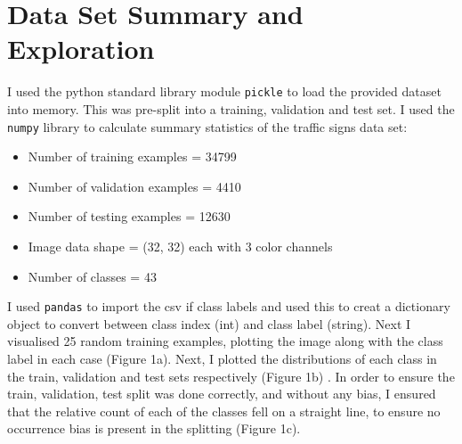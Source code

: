\documentclass[letterpaper,12pt]{article}
\begin{document}
\section{Data Set Summary and Exploration }
I used the python standard library module \texttt{pickle} to load the provided dataset into memory. This was pre-split into a training, validation and test set. I used the \texttt{numpy} library to calculate summary statistics of the traffic signs data set: 
\begin{itemize}
\item Number of training examples = 34799 
\item Number of validation examples = 4410 
\item Number of testing examples = 12630 
\item Image data shape = (32, 32) each with 3 color channels 
\item Number of classes = 43
\end{itemize}
I used \texttt{pandas} to import the csv if class labels and used this to creat a dictionary object to convert between class index (int) and class label (string). Next I visualised 25 random training examples, plotting the image along with the class label in each case (Figure 1a). Next, I plotted the distributions of each class in the train, validation and test sets respectively (Figure 1b) . In order to ensure the train, validation, test split was done correctly, and without any bias, I ensured that the relative count of each of the classes fell on a straight line, to ensure no occurrence bias is present in the splitting (Figure 1c).
\end{document}

